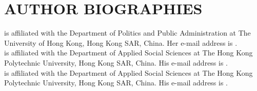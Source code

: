 \documentclass{wscpaperproc}
\begin{document}
\section*{AUTHOR BIOGRAPHIES}

 is affiliated with the Department of Politics and Public Administration at The University of Hong Kong, Hong Kong SAR, China. Her e-mail address is .\\

 is affiliated with the Department of Applied Social Sciences at The Hong Kong Polytechnic University, Hong Kong SAR, China. His e-mail address is .\\

 is affiliated with the Department of Applied Social Sciences at The Hong Kong Polytechnic University, Hong Kong SAR, China. His e-mail address is .
\end{document}
